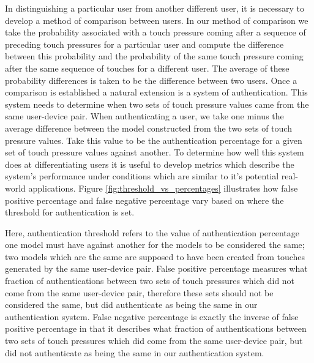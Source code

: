 \documentclass{acm_proc_article-sp}
\begin{document}
In distinguishing a particular user from another different user, it is necessary to develop a method of comparison between users. In our method of comparison we take the probability associated with a touch pressure coming after a sequence of preceding touch pressures for a particular user and compute the difference between this probability and the probability of the same touch pressure coming after the same sequence of touches for a different user. The average of these probability differences is taken to be the difference between two users.
%
Once a comparison is established a natural extension is a system of authentication. This system needs to determine when two sets of touch pressure values came from the same user-device pair. When authenticating a user, we take one minus the average difference between the model constructed from the two sets of touch pressure values. Take this value to be the authentication percentage for a given set of touch pressure values against another.
%
To determine how well this system does at differentiating users it is useful to develop metrics which describe the system's performance under conditions which are similar to it's potential real-world applications. Figure \ref{fig:threshold_vs_percentages} illustrates how false positive percentage and false negative percentage vary based on where the threshold for authentication is set. 

Here, authentication threshold refers to the value of authentication percentage one model must have against another for the models to be considered the same; two models which are the same are supposed to have been created from touches generated by the same user-device pair.
False positive percentage measures what fraction of authentications between two sets of touch pressures which did not come from the same user-device pair, therefore these sets should not be considered the same, but did authenticate as being the same in our authentication system.
False negative percentage is exactly the inverse of false positive percentage in that it describes what fraction of authentications between two sets of touch pressures which did come from the same user-device pair, but did not authenticate as being the same in our authentication system.
\end{document}
